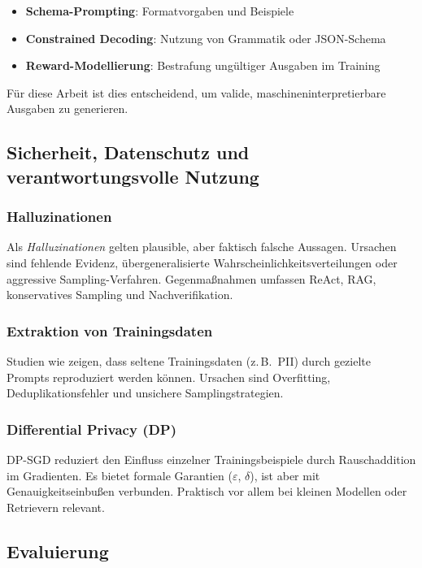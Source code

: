 \begin{itemize}
    \item \textbf{Schema-Prompting}: Formatvorgaben und Beispiele
    \item \textbf{Constrained Decoding}: Nutzung von Grammatik oder JSON-Schema
    \item \textbf{Reward-Modellierung}: Bestrafung ungültiger Ausgaben im Training \cite{cong2023schema}
\end{itemize}

Für diese Arbeit ist dies entscheidend, um valide, maschineninterpretierbare Ausgaben zu generieren.

\subsection{Sicherheit, Datenschutz und verantwortungsvolle Nutzung}

\subsubsection{Halluzinationen}

Als \emph{Halluzinationen} gelten plausible, aber faktisch falsche Aussagen. Ursachen sind fehlende Evidenz, übergeneralisierte Wahrscheinlichkeitsverteilungen oder aggressive Sampling-Verfahren. Gegenmaßnahmen umfassen ReAct, RAG, konservatives Sampling und Nachverifikation.

\subsubsection{Extraktion von Trainingsdaten}

Studien wie \cite{carlini2021extracting} zeigen, dass seltene Trainingsdaten (z.\,B.\ PII) durch gezielte Prompts reproduziert werden können. Ursachen sind Overfitting, Deduplikationsfehler und unsichere Samplingstrategien.

\subsubsection{Differential Privacy (DP)}

DP-SGD \cite{abadi2016deep} reduziert den Einfluss einzelner Trainingsbeispiele durch Rauschaddition im Gradienten. Es bietet formale Garantien ($\varepsilon$, $\delta$), ist aber mit Genauigkeitseinbußen verbunden. Praktisch vor allem bei kleinen Modellen oder Retrievern relevant.

\subsection{Evaluierung}

